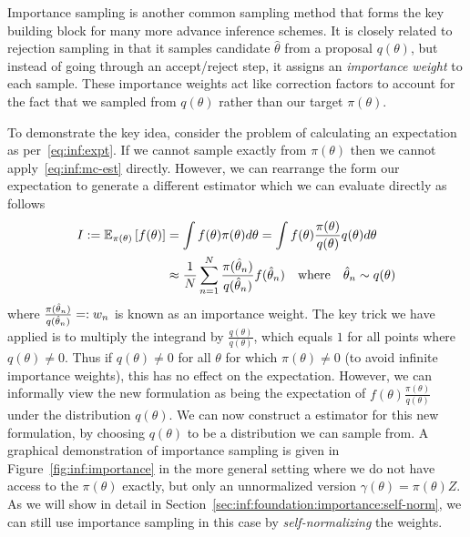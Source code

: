 
Importance sampling is another common sampling method that forms the key building block
for many more advance inference schemes.  It is closely related to rejection sampling in that
it samples candidate $\hat{\theta}$ from a proposal $q(\theta)$, but instead of going
through an accept/reject step, it assigns an \emph{importance weight} to each sample.
These importance weights act like correction factors to account for the fact that we sampled
from $q(\theta)$ rather than our target $\pi(\theta)$.

To demonstrate the key idea, consider the problem of calculating an expectation as
per~\eqref{eq:inf:expt}.  If we cannot sample exactly from $\pi(\theta)$ then we cannot
apply~\eqref{eq:inf:mc-est} directly.  However, we can rearrange the form our expectation
to generate a different \mc estimator which we can evaluate directly as follows
\begin{align}
	I:=\mathbb{E}_{\pi(\theta)} \left[f(\theta)\right] &=\int f(\theta) \pi(\theta) d\theta 
	= \int f(\theta) \frac{\pi(\theta)}{q(\theta)} q(\theta) d\theta \nonumber \\
	&\approx \frac{1}{N} \sum_{n=1}^{N} \frac{\pi(\hat{\theta}_n)}{q(\hat{\theta}_n)} f(\hat{\theta}_n)
	\quad \text{where} \quad \hat{\theta}_n \sim q(\theta) 	\label{eq:inf:importance}
\end{align}
where $\frac{\pi(\hat{\theta}_n)}{q(\hat{\theta}_n)} =: w_n$ is known as an importance weight.
The key trick we have applied is to multiply the integrand by $\frac{q(\theta)}{q(\theta)}$, which
equals $1$
for all points where $q(\theta) \neq 0$.  Thus if $q(\theta) \neq 0$ for all $\theta$ for which
$\pi(\theta) \neq 0$ (to avoid infinite importance weights), this has no effect on the 
expectation.  However, we can informally view the new
formulation as being the expectation of $f(\theta) \frac{\pi(\theta)}{q(\theta)}$ under the
distribution $q(\theta)$.  We can now construct a \mc estimator for this new formulation, 
by choosing $q(\theta)$ to be a distribution we can sample from.  A graphical
demonstration of importance sampling is given in Figure~\ref{fig:inf:importance} in the
more general setting where we do not have access to the $\pi(\theta)$ exactly, but only
an unnormalized version $\gamma(\theta)=\pi(\theta)Z$.  As we will show in detail in
Section~\ref{sec:inf:foundation:importance:self-norm}, we can still use importance sampling
in this case by \emph{self-normalizing} the weights.


